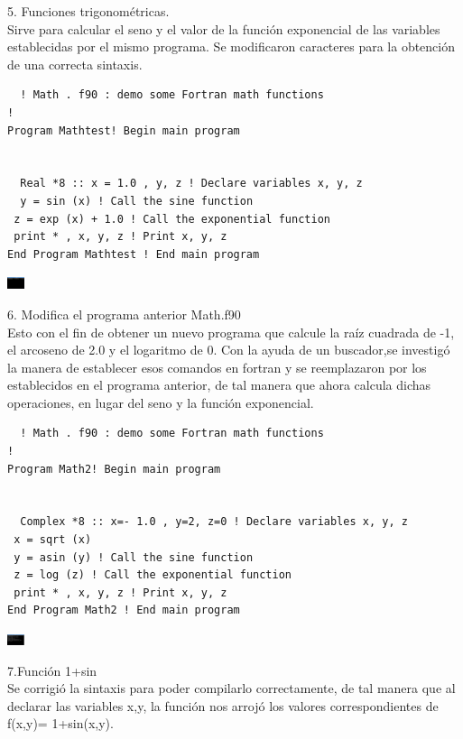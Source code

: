 \documentclass[12pt]{article}
\begin{document}
  5. Funciones trigonométricas.\\
  Sirve para calcular el seno y el valor de la función exponencial de las variables establecidas por el mismo programa. Se modificaron caracteres para la obtención de una correcta sintaxis.\\
  \begin{verbatim}
  ! Math . f90 : demo some Fortran math functions
!
Program Mathtest! Begin main program


  Real *8 :: x = 1.0 , y, z ! Declare variables x, y, z
  y = sin (x) ! Call the sine function
 z = exp (x) + 1.0 ! Call the exponential function
 print * , x, y, z ! Print x, y, z
End Program Mathtest ! End main program
 \end{verbatim}
  \begin{center}
\includegraphics[width=0.5cm]{Trigonometricas.png}\\
 \end{center}
  6.  Modifica el programa anterior Math.f90\\
  Esto con el fin de obtener un nuevo programa que calcule la raíz cuadrada de -1, el arcoseno de 2.0 y el logaritmo de 0. Con la ayuda de un buscador,se investigó la manera de establecer esos comandos en fortran y se reemplazaron por los establecidos en el programa anterior, de tal manera que ahora calcula dichas operaciones, en lugar del seno y la función exponencial.\\
  \begin{verbatim}
  ! Math . f90 : demo some Fortran math functions
!
Program Math2! Begin main program


  Complex *8 :: x=- 1.0 , y=2, z=0 ! Declare variables x, y, z
 x = sqrt (x)  
 y = asin (y) ! Call the sine function
 z = log (z) ! Call the exponential function
 print * , x, y, z ! Print x, y, z
End Program Math2 ! End main program
 \end{verbatim}
  \begin{center}
\includegraphics[width=0.5cm]{Mathf90.png}\\
 \end{center}
 7.Función 1+sin\\
  Se corrigió la sintaxis para poder compilarlo correctamente, de tal manera que al declarar las variables x,y, la función nos arrojó los valores correspondientes de f(x,y)= 1+sin(x,y).\\
\end{document}
